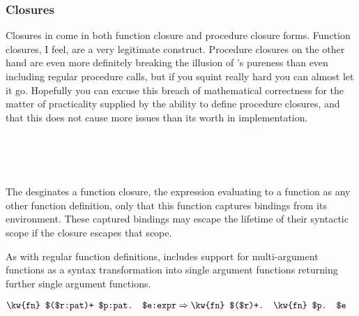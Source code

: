 \subsubsection{Closures}

Closures in \Trilogy{} come in both function closure and procedure closure forms.
Function closures, I feel, are a very legitimate construct. Procedure closures
on the other hand are even more definitely breaking the illusion of \Poetry{}'s
pureness than even including regular procedure calls, but if you squint really
hard you can almost let it go. Hopefully you can excuse this breach of mathematical
correctness for the matter of practicality supplied by the ability to define
procedure closures, and that this does not cause more issues than its worth
in implementation.

\begin{bnf*}
     \\
     \\
     \\
\end{bnf*}

The  desginates a function closure, the  expression evaluating
to a function as any other function definition, only that this function
captures bindings from its environment. These captured bindings may escape
the lifetime of their syntactic scope if the closure escapes that scope.

As with regular function definitions,  includes support for
multi-argument functions as a syntax transformation into single argument
functions returning further single argument functions.

\begin{align*}
    \texttt{\kw{fn} \$(\$r:pat)+ \$p:pat. \$e:expr} & \Rightarrow \texttt{\kw{fn} \$(\$r)+. \kw{fn} \$p. \$e} %
\end{align*}

